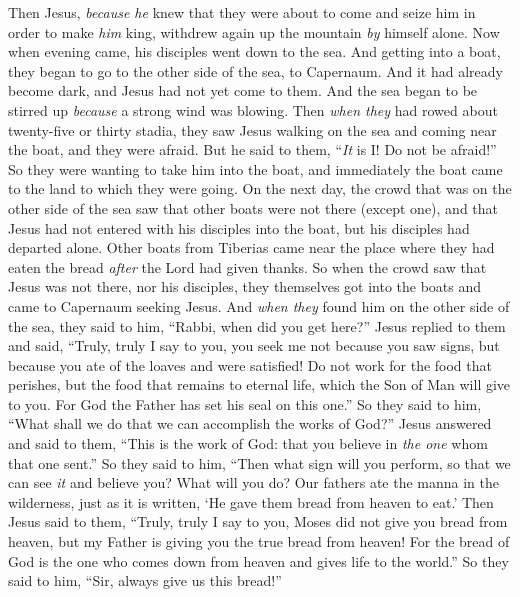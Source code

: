 \begin{biblechapter}
\verse Then Jesus, \textit{because he} knew that they were about to come and seize him in order to make \textit{him} king, withdrew again up the mountain \textit{by} himself alone.
 Now when evening came, his disciples went down to the sea.
\verse And getting into a boat, they began to go to the other side of the sea, to Capernaum. And it had already become dark, and Jesus had not yet come to them.
\verse And the sea began to be stirred up \textit{because} a strong wind was blowing.
\verse Then \textit{when they} had rowed about twenty-five or thirty stadia, they saw Jesus walking on the sea and coming near the boat, and they were afraid.
\verse But he said to them, “\textit{It} is I! Do not be afraid!”
\verse So they were wanting to take him into the boat, and immediately the boat came to the land to which they were going.
 On the next day, the crowd that was on the other side of the sea saw that other boats were not there (except one), and that Jesus had not entered with his disciples into the boat, but his disciples had departed alone.
\verse Other boats from Tiberias came near the place where they had eaten the bread \textit{after} the Lord had given thanks.
\verse So when the crowd saw that Jesus was not there, nor his disciples, they themselves got into the boats and came to Capernaum seeking Jesus.
\verse And \textit{when they} found him on the other side of the sea, they said to him, “Rabbi, when did you get here?”
\verse Jesus replied to them and said, “Truly, truly I say to you, you seek me not because you saw signs, but because you ate of the loaves and were satisfied!
\verse Do not work for the food that perishes, but the food that remains to eternal life, which the Son of Man will give to you. For God the Father has set his seal on this one.”
\verse So they said to him, “What shall we do that we can accomplish the works of God?”
\verse Jesus answered and said to them, “This is the work of God: that you believe in \textit{the one} whom that one sent.”
\verse So they said to him, “Then what sign will you perform, so that we can see \textit{it} and believe you? What will you do?
\verse Our fathers ate the manna in the wilderness, just as it is written, ‘He gave them bread from heaven to eat.’
\verse Then Jesus said to them, “Truly, truly I say to you, Moses did not give you bread from heaven, but my Father is giving you the true bread from heaven!
\verse For the bread of God is the one who comes down from heaven and gives life to the world.”
\verse So they said to him, “Sir, always give us this bread!”

\end{biblechapter}
